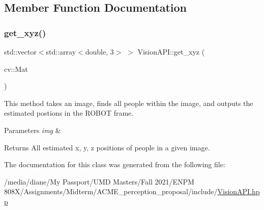 \subsection{Member Function Documentation}
\mbox{\label{class_vision_a_p_i_a2abdb5d06b3c66789a970d541a44f55e}} 
\subsubsection{\texorpdfstring{get\+\_\+xyz()}{get\_xyz()}}
{\footnotesize\ttfamily std\+::vector$<$std\+::array$<$double, 3$>$ $>$ Vision\+A\+P\+I\+::get\+\_\+xyz (\begin{DoxyParamCaption}\item[{cv\+::\+Mat}]{ }\end{DoxyParamCaption})}



This method takes an image, finds all people within the image, and outputs the estimated postions in the R\+O\+B\+OT frame. 


\begin{DoxyParams}{Parameters}
{\em img} & \\
\hline
\end{DoxyParams}
\begin{DoxyReturn}{Returns}
All estimated x, y, z positions of people in a given image. 
\end{DoxyReturn}


The documentation for this class was generated from the following file\+:\begin{DoxyCompactItemize}
\item 
/media/diane/\+My Passport/\+U\+M\+D Masters/\+Fall 2021/\+E\+N\+P\+M 808\+X/\+Assignments/\+Midterm/\+A\+C\+M\+E\+\_\+perception\+\_\+proposal/include/\hyperlink{_vision_a_p_i_8hpp}{Vision\+A\+P\+I.\+hpp}\end{DoxyCompactItemize}
